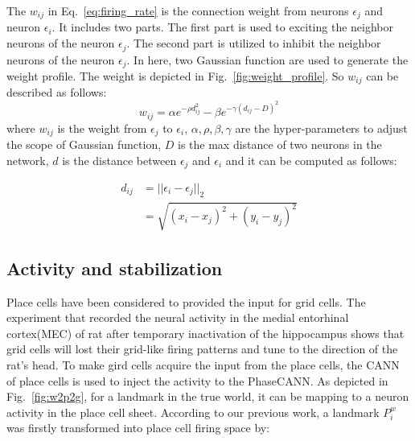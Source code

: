 \documentclass[preprint,12pt]{elsarticle}
\begin{document}
The $w_{ij}$ in Eq.~\eqref{eq:firing_rate} is the connection weight from neurons $\epsilon_j$ and neuron $\epsilon_i$. It includes two parts. The first part is used to exciting the neighbor neurons of the neuron $\epsilon_j$. The second part is utilized to inhibit the neighbor neurons of the neuron $\epsilon_j$. In here, two Gaussian function are used to generate the weight profile. The weight is depicted in Fig.~\ref{fig:weight_profile}. So $w_{ij}$ can be described as follows:
\begin{equation}\label{eq:weight_gc}
	w_{ij}=\alpha e^{-\rho d_{ij}^2} - \beta e^{-\gamma (d_{ij}-D)^2}
\end{equation}
where $w_{ij}$ is the weight from $\epsilon_{j}$ to $\epsilon_{i}$, $\alpha,\rho,\beta,\gamma$ are the hyper-parameters to adjust the scope of Gaussian function, $D$ is the max distance of two neurons in the network, $d$ is the distance between $\epsilon_{j}$ and $\epsilon_{i}$ and it can be computed as follows:

\begin{align}
	d_{ij} &= ||\epsilon_{i} - \epsilon_{j}||_2 \\
	&=\sqrt{(x_i-x_j)^2+(y_i-y_j)^2}	 
\end{align}	

\subsection{Activity and stabilization}

Place cells have been considered to provided the input for grid cells. The experiment that recorded the neural activity in the medial entorhinal cortex(MEC) of rat after temporary inactivation of the hippocampus shows that grid cells will lost their grid-like firing patterns and tune to the direction of the rat's head\cite{Bonnevie2013}. To make gird cells acquire the input from the place cells, the CANN of place cells\cite{McNaughton2006} is used to inject the activity to the PhaseCANN. As depicted in Fig.~\ref{fig:w2p2g}, for a landmark in the true world, it can be mapping to a neuron activity in the place cell sheet. \alert{According to our previous work}, a landmark $P^w_i$ was firstly transformed into place cell firing space by:
\end{document}
